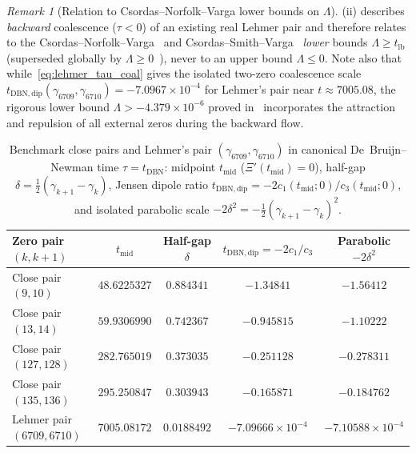 \documentclass[11pt,reqno]{amsart}
\theoremstyle{plain}
\theoremstyle{definition}
\theoremstyle{remark}
\newtheorem{remark}[theorem]{Remark}
\numberwithin{equation}{section}
\begin{document}
\begin{remark}[Relation to Csordas--Norfolk--Varga lower bounds on $\Lambda$]\label{rem:cnv_bounds}
(ii) describes \emph{backward} coalescence ($\tau < 0$) of an existing real Lehmer pair and therefore relates to the Csordas--Norfolk--Varga~\cite{csordas1988} and Csordas--Smith--Varga~\cite{csordas1994} \emph{lower} bounds $\Lambda \ge t_{\mathrm{lb}}$ (superseded globally by $\Lambda \ge 0$~\cite{rodgerstao2020}), never to an upper bound $\Lambda \le 0$. Note also that while~\eqref{eq:lehmer_tau_coal} gives the isolated two-zero coalescence scale $t_{\mathrm{DBN,dip}}(\gamma_{6709}, \gamma_{6710}) = -7.0967 \times 10^{-4}$ for Lehmer's pair near $t \approx 7005.08$, the rigorous lower bound $\Lambda > -4.379 \times 10^{-6}$ proved in~\cite{csordas1994} incorporates the attraction and repulsion of all external zeros during the backward flow.
\end{remark}

\begin{table}[htbp]
\centering
\caption{Benchmark close pairs and Lehmer's pair $(\gamma_{6709}, \gamma_{6710})$ in canonical De~Bruijn--Newman time $\tau = t_{\mathrm{DBN}}$: midpoint $t_{\mathrm{mid}}$ ($\Xi'(t_{\mathrm{mid}}) = 0$), half-gap $\delta = \frac{1}{2}(\gamma_{k+1} - \gamma_k)$, Jensen dipole ratio $t_{\mathrm{DBN,dip}} = -2c_1(t_{\mathrm{mid}};0)/c_3(t_{\mathrm{mid}};0)$, and isolated parabolic scale $-2\delta^2 = -\frac{1}{2}(\gamma_{k+1}-\gamma_k)^2$.}\label{tab:lehmer}
\small
\begin{tabular}{@{}lcccc@{}}
\toprule
Zero pair $(k, k+1)$ & $t_{\mathrm{mid}}$ & Half-gap $\delta$ & $t_{\mathrm{DBN,dip}} = -2c_1/c_3$ & Parabolic $-2\delta^2$ \\
\midrule
Close pair $(9, 10)$ & $48.6225327$ & $0.884341$ & $-1.34841$ & $-1.56412$ \\
Close pair $(13, 14)$ & $59.9306990$ & $0.742367$ & $-0.945815$ & $-1.10222$ \\
Close pair $(127, 128)$ & $282.765019$ & $0.373035$ & $-0.251128$ & $-0.278311$ \\
Close pair $(135, 136)$ & $295.250847$ & $0.303943$ & $-0.165871$ & $-0.184762$ \\
Lehmer pair $(6709, 6710)$ & $7005.08172$ & $0.0188492$ & $-7.09666 \times 10^{-4}$ & $-7.10588 \times 10^{-4}$ \\
\bottomrule
\end{tabular}
\end{table}
\end{document}
